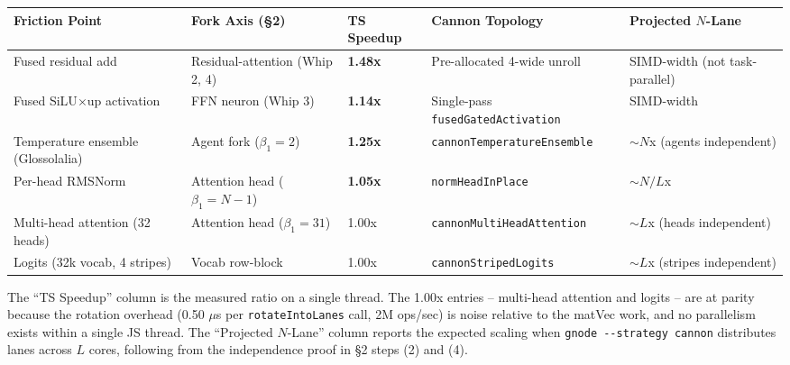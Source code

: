 \documentclass[
  11pt,
]{article}
\newcounter{none} %
\begin{document}
{\def\LTcaptype{none}
\begin{longtable}[]{@{}
  >{\raggedright\arraybackslash}p{}
  >{\raggedright\arraybackslash}p{}
  >{\raggedright\arraybackslash}p{}
  >{\raggedright\arraybackslash}p{}
  >{\raggedright\arraybackslash}p{}@{}}
\toprule\noalign{}
\begin{minipage}[b]{\linewidth}\raggedright
Friction Point
\end{minipage} & \begin{minipage}[b]{\linewidth}\raggedright
Fork Axis (§2)
\end{minipage} & \begin{minipage}[b]{\linewidth}\raggedright
TS Speedup
\end{minipage} & \begin{minipage}[b]{\linewidth}\raggedright
Cannon Topology
\end{minipage} & \begin{minipage}[b]{\linewidth}\raggedright
Projected \(N\)-Lane
\end{minipage} \\
\midrule\noalign{}
\endhead
\bottomrule\noalign{}
\endlastfoot
Fused residual add & Residual-attention (Whip 2, 4) & \textbf{1.48x} & Pre-allocated 4-wide unroll & SIMD-width (not task-parallel) \\
Fused SiLU\(\times\)up activation & FFN neuron (Whip 3) & \textbf{1.14x} & Single-pass \texttt{fusedGatedActivation} & SIMD-width \\
Temperature ensemble (Glossolalia) & Agent fork (\(\beta_1 = 2\)) & \textbf{1.25x} & \texttt{cannonTemperatureEnsemble} & \(\sim N\)x (agents independent) \\
Per-head RMSNorm & Attention head (\(\beta_1 = N-1\)) & \textbf{1.05x} & \texttt{normHeadInPlace} & \(\sim N/L\)x \\
Multi-head attention (32 heads) & Attention head (\(\beta_1 = 31\)) & 1.00x & \texttt{cannonMultiHeadAttention} & \(\sim L\)x (heads independent) \\
Logits (32k vocab, 4 stripes) & Vocab row-block & 1.00x & \texttt{cannonStripedLogits} & \(\sim L\)x (stripes independent) \\
\end{longtable}
}

The ``TS Speedup'' column is the measured ratio on a single thread.  The 1.00x entries -- multi-head attention and logits -- are at parity because the rotation overhead (0.50 \(\mu\)s per \texttt{rotateIntoLanes} call, 2M ops/sec) is noise relative to the matVec work, and no parallelism exists within a single JS thread.  The ``Projected \(N\)-Lane'' column reports the expected scaling when \texttt{gnode -{}-strategy cannon} distributes lanes across \(L\) cores, following from the independence proof in §2 steps (2) and (4).
\end{document}
